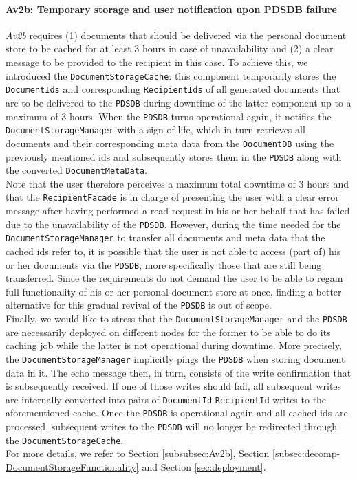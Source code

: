 \documentclass[a4paper,10pt]{article}
\begin{document}
\paragraph{Av2b: Temporary storage and user notification upon PDSDB failure}
\textit{Av2b} requires (1) documents that should be delivered via the personal document store to be cached for at least 3 hours in case of unavailability and (2) a clear message to be provided to the recipient in this case. To achieve this, we introduced the \texttt{DocumentStorageCache}: this component temporarily stores the \texttt{DocumentIds} and corresponding \texttt{RecipientIds} of all generated documents that are to be delivered to the \texttt{PDSDB} during downtime of the latter component up to a maximum of 3 hours. When the \texttt{PDSDB} turns operational again, it notifies the \texttt{DocumentStorageManager} with a sign of life, which in turn retrieves all documents and their corresponding meta data from the \texttt{DocumentDB} using the previously mentioned ids and subsequently stores them in the \texttt{PDSDB} along with the converted \texttt{DocumentMetaData}.\\
Note that the user therefore perceives a maximum total downtime of 3 hours and that the \texttt{RecipientFacade} is in charge of presenting the user with a clear error message after having performed a read request in his or her behalf that has failed due to the unavailability of the \texttt{PDSDB}. However, during the time needed for the \texttt{DocumentStorageManager} to transfer all documents and meta data that the cached ids refer to, it is possible that the user is not able to access (part of) his or her documents via the \texttt{PDSDB}, more specifically those that are still being transferred. Since the requirements do not demand the user to be able to regain full functionality of his or her personal document store at once, finding a better alternative for this gradual revival of the \texttt{PDSDB} is out of scope.\\
Finally, we would like to stress that the \texttt{DocumentStorageManager} and the \texttt{PDSDB} are necessarily deployed on different nodes for the former to be able to do its caching job while the latter is not operational during downtime. More precisely, the \texttt{DocumentStorageManager} implicitly pings the \texttt{PDSDB} when storing document data in it. The echo message then, in turn, consists of the write confirmation that is subsequently received. If one of those writes should fail, all subsequent writes are internally converted into pairs of \texttt{DocumentId}-\texttt{RecipientId} writes to the aforementioned cache. Once the \texttt{PDSDB} is operational again and all cached ids are processed, subsequent writes to the \texttt{PDSDB} will no longer be redirected through the \texttt{DocumentStorageCache}.\\
For more details, we refer to Section \ref{subsubsec:Av2b}, Section \ref{subsec:decomp-DocumentStorageFunctionality} and Section \ref{sec:deployment}.
\end{document}
